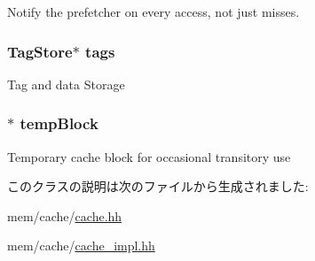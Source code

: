 \label{classCache_a146f074bf7af4a70fc378862eab0b15a}
Notify the prefetcher on every access, not just misses. \hypertarget{classCache_adb086ae267638f3864a6b3199f1d01e9}{
\subsubsection[{tags}]{\setlength{\rightskip}{0pt plus 5cm}TagStore$\ast$ {\bf tags}}}
\label{classCache_adb086ae267638f3864a6b3199f1d01e9}
Tag and data Storage \hypertarget{classCache_a0ca2086b66114357dd17032178adce17}{
\subsubsection[{tempBlock}]{$\ast$ {\bf tempBlock}}}
\label{classCache_a0ca2086b66114357dd17032178adce17}
Temporary cache block for occasional transitory use 

このクラスの説明は次のファイルから生成されました:\begin{DoxyCompactItemize}
\item 
mem/cache/\hyperlink{cache_8hh}{cache.hh}\item 
mem/cache/\hyperlink{cache__impl_8hh}{cache\_\-impl.hh}\end{DoxyCompactItemize}

